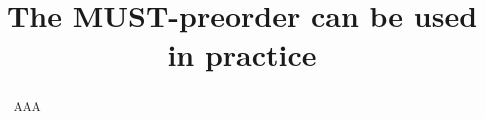 \documentclass[english,a4paper,cleveref,thm-restate,hidecoq]{lipics-style/lipics-v2021}
\title{The MUST-preorder can be used in practice}
\begin{document}
\maketitle

\begin{abstract}
  AAA
\end{abstract}











%
%

\clearpage

\newcommand{\asleqAfw}{\preccurlyeq^{\fw}_{\textsf{acc}}}
\newcommand{\ohmy}{O}

\appendix%


\end{document}

